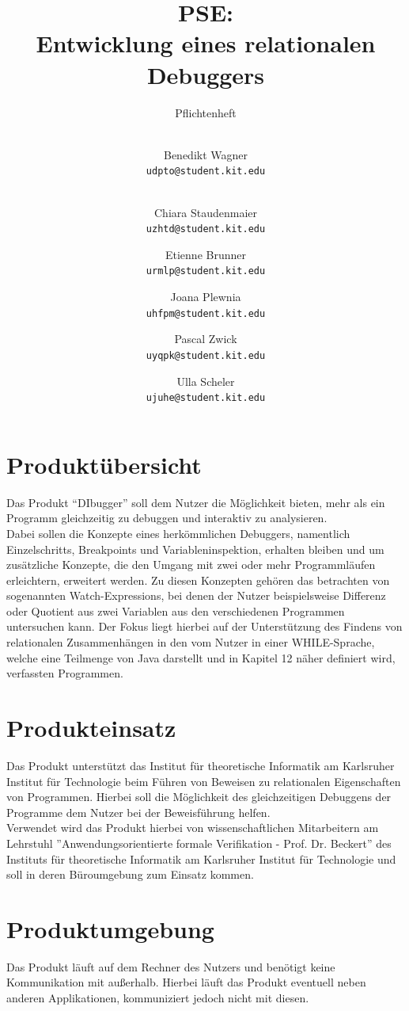 \documentclass[parskip=full]{scrartcl}
\title{
	\vspace{2cm}
	PSE:\\ 
	Entwicklung eines relationalen Debuggers\\
}
\subtitle{
	\vspace{1cm}Pflichtenheft
}
\author{
	\vspace{1cm} \\
	Benedikt Wagner\\
	\texttt{udpto@student.kit.edu}
	\and \vspace{1cm} \\ Chiara Staudenmaier\\
	\texttt{uzhtd@student.kit.edu}
	\and Etienne Brunner\\
	\texttt{urmlp@student.kit.edu}
	\and Joana Plewnia\\
	\texttt{uhfpm@student.kit.edu} 
	\and Pascal Zwick\\
	\texttt{uyqpk@student.kit.edu}
	\and Ulla Scheler\\
	\texttt{ujuhe@student.kit.edu}
}
\begin{document}
\maketitle
\newpage

\tableofcontents
\newpage


\section{Produktübersicht}
Das Produkt \enquote{DIbugger} soll dem Nutzer die Möglichkeit bieten, mehr als ein Programm gleichzeitig zu debuggen und interaktiv zu analysieren. \\
Dabei sollen die Konzepte eines herkömmlichen Debuggers, namentlich \glspl{Einzelschritt}, \glspl{Breakpoint} und Variableninspektion, erhalten bleiben und um zusätzliche Konzepte, die den Umgang mit zwei oder mehr Programmläufen erleichtern, erweitert werden. Zu diesen Konzepten gehören das betrachten von sogenannten \glspl{Watch-Expression}, bei denen der Nutzer beispielsweise Differenz oder Quotient aus zwei Variablen aus den verschiedenen Programmen untersuchen kann. Der Fokus liegt hierbei auf der Unterstützung des Findens von relationalen Zusammenhängen in den vom Nutzer in einer WHILE-Sprache, welche eine Teilmenge von Java darstellt und in Kapitel 12 näher definiert wird, verfassten Programmen.


\section{Produkteinsatz}
Das Produkt unterstützt das Institut für theoretische Informatik am Karlsruher Institut für Technologie beim Führen von Beweisen zu relationalen Eigenschaften von Programmen. Hierbei soll die Möglichkeit des gleichzeitigen Debuggens der Programme dem Nutzer bei der Beweisführung helfen. \\
Verwendet wird das Produkt hierbei von wissenschaftlichen Mitarbeitern am Lehrstuhl ''Anwendungsorientierte formale Verifikation - Prof. Dr. Beckert'' des Instituts für theoretische Informatik am Karlsruher Institut für Technologie und soll in deren Büroumgebung zum Einsatz kommen. 

 
 \newpage

\section{Produktumgebung}
Das Produkt läuft auf dem Rechner des Nutzers und benötigt keine Kommunikation mit außerhalb. Hierbei läuft das Produkt eventuell neben anderen Applikationen, kommuniziert jedoch nicht mit diesen.
\end{document}
